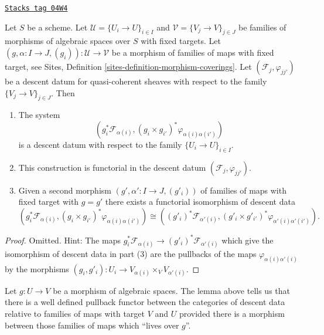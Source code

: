 \begin{lemma}
\label{spaces-descent-lemma-map-families}
\href{https://stacks.math.columbia.edu/tag/04W4}{\texttt{Stacks tag 04W4}}

Let $S$ be a scheme.
Let $\mathcal{U} = \{U_i \to U\}_{i \in I}$ and
$\mathcal{V} = \{V_j \to V\}_{j \in J}$
be families of morphisms of algebraic spaces over $S$ with fixed targets.
Let $(g, \alpha : I \to J, (g_i)) : \mathcal{U} \to \mathcal{V}$
be a morphism of families of maps with fixed target, see
Sites, Definition \ref{sites-definition-morphism-coverings}.
Let $(\mathcal{F}_j, \varphi_{jj'})$ be a descent
datum for quasi-coherent sheaves with respect to the
family $\{V_j \to V\}_{j \in J}$. Then
\begin{enumerate}
\item The system
$$
\left(g_i^*\mathcal{F}_{\alpha(i)},
(g_i \times g_{i'})^*\varphi_{\alpha(i)\alpha(i')}\right)
$$
is a descent datum with respect to the family $\{U_i \to U\}_{i \in I}$.
\item This construction is functorial in the descent datum
$(\mathcal{F}_j, \varphi_{jj'})$.
\item Given a second morphism
$(g', \alpha' : I \to J, (g'_i))$
of families of maps with fixed target
with $g = g'$ there exists a functorial isomorphism of descent data
$$
(g_i^*\mathcal{F}_{\alpha(i)},
(g_i \times g_{i'})^*\varphi_{\alpha(i)\alpha(i')})
\cong
((g'_i)^*\mathcal{F}_{\alpha'(i)},
(g'_i \times g'_{i'})^*\varphi_{\alpha'(i)\alpha'(i')}).
$$
\end{enumerate}
\end{lemma}

\begin{proof}
Omitted. Hint: The maps
$g_i^*\mathcal{F}_{\alpha(i)} \to (g'_i)^*\mathcal{F}_{\alpha'(i)}$
which give the isomorphism of descent data in part (3)
are the pullbacks of the maps $\varphi_{\alpha(i)\alpha'(i)}$ by the
morphisms $(g_i, g'_i) : U_i \to V_{\alpha(i)} \times_V V_{\alpha'(i)}$.
\end{proof}

Let $g : U \to V$ be a morphism of algebraic spaces.
The lemma above tells us that there is a well defined pullback functor
between the categories of descent data relative to families of
maps with target $V$ and $U$ provided there is a morphism between those
families of maps which ``lives over $g$''.

